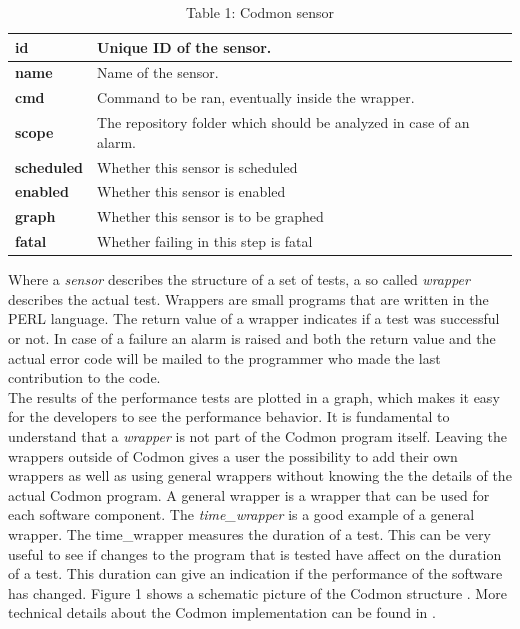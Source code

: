 \documentclass{article}
\begin{document}
\begin{table}[h]
\centering
  \begin{tabular}{ | l| p{5cm} |}
  \hline
  \textbf{id} & Unique ID of the sensor. \\ \hline
  \textbf{name} & Name of the sensor. \\ \hline
  \textbf{cmd} & Command to be ran, eventually inside the wrapper. \\ \hline
  \textbf{scope} & The repository folder which should be analyzed in case of an alarm. \\ \hline
  \textbf{scheduled} & Whether this sensor is scheduled \\ \hline
  \textbf{enabled} & Whether this sensor is enabled \\ \hline
  \textbf{graph} & Whether this sensor is to be graphed \\ \hline
  \textbf{fatal} & Whether failing in this step is fatal\\ \hline
  \end{tabular}
\caption{Table 1: Codmon sensor}
\label{tab:codsensor}
\end{table}


\noindent Where a \emph{sensor} describes the structure of a set of tests, a so called \emph{wrapper} describes the actual test. Wrappers are small programs that are written in the PERL
language. The return value of a wrapper indicates if a test was successful or not. In case of a failure an alarm is raised and both the return value and the actual error code will be mailed to
the programmer who made the last contribution to the code.\\

\noindent The results of the performance tests are plotted in a graph, which makes it easy for the developers to see the performance
behavior. It is fundamental to understand that a \emph{wrapper} is not part of the Codmon program itself. Leaving the wrappers outside of Codmon gives a user the possibility to add their own 
wrappers as well as using general wrappers without knowing the the details of the actual Codmon program. A general wrapper is a wrapper that can be used for each software component. The 
\emph{time\_wrapper} is a good example of a general wrapper. The time\_wrapper measures the duration of a test. This can be very useful to see if changes to the program that is tested have affect on the 
duration of a test. This duration can give an indication if the performance of the software has changed. Figure 1 shows a schematic picture of the Codmon structure \cite{Codmon}. More technical details 
about the Codmon implementation can be found in \cite{Codmon}.\\
\end{document}
